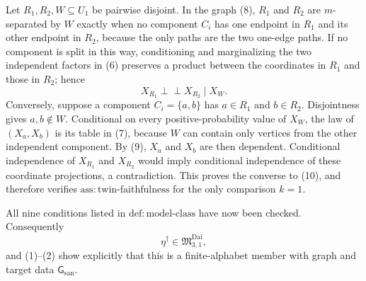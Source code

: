 Let \(R_1,R_2,W\subseteq U_1\) be pairwise disjoint.  In the graph (8), \(R_1\) and \(R_2\) are \(m\)-separated by \(W\) exactly when no component \(C_i\) has one endpoint in \(R_1\) and its other endpoint in \(R_2\), because the only paths are the two one-edge paths.  If no component is split in this way, conditioning and marginalizing the two independent factors in (6) preserves a product between the coordinates in \(R_1\) and those in \(R_2\); hence
\[
 X_{R_1}\mathbin{\perp\!\!\!\perp}X_{R_2}\mid X_W.
 \tag{10}
\]
Conversely, suppose a component \(C_i=\{a,b\}\) has \(a\in R_1\) and \(b\in R_2\).  Disjointness gives \(a,b\notin W\).  Conditional on every positive-probability value of \(X_W\), the law of \((X_a,X_b)\) is its table in (7), because \(W\) can contain only vertices from the other independent component.  By (9), \(X_a\) and \(X_b\) are then dependent.  Conditional independence of \(X_{R_1}\) and \(X_{R_2}\) would imply conditional independence of these coordinate projections, a contradiction.  This proves the converse to (10), and therefore verifies \(\mathrm{ass:twin\mbox{-}faithfulness}\) for the only comparison \(k=1\).

All nine conditions listed in \(\mathrm{def:model\mbox{-}class}\) have now been checked.  Consequently
\[
 \eta^\dagger\in\mathfrak M_{3,1}^{\mathrm{Dai}},
 \tag{11}
\]
and (1)--(2) show explicitly that this is a finite-alphabet member with graph and target data \(\mathsf G_{\mathrm{san}}\).

